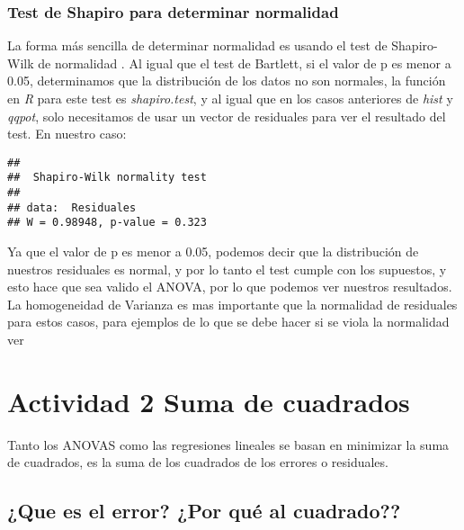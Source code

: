 \documentclass[]{book}
\newenvironment{Shaded}{\begin{snugshade}}{\end{snugshade}}
\newcommand{\KeywordTok}[1]{\textcolor[rgb]{0.13,0.29,0.53}{\textbf{#1}}}
\newcommand{\NormalTok}[1]{#1}
\newcommand{\OperatorTok}[1]{\textcolor[rgb]{0.81,0.36,0.00}{\textbf{#1}}}
\begin{document}
\hypertarget{test-de-shapiro-para-determinar-normalidad}{%
\subsubsection{Test de Shapiro para determinar normalidad}\label{test-de-shapiro-para-determinar-normalidad}}

La forma más sencilla de determinar normalidad es usando el test de Shapiro-Wilk de normalidad \citep{royston1995remark}. Al igual que el test de Bartlett, si el valor de p es menor a 0.05, determinamos que la distribución de los datos no son normales, la función en \emph{R} para este test es \emph{shapiro.test}, y al igual que en los casos anteriores de \emph{hist} y \emph{qqpot}, solo necesitamos de usar un vector de residuales para ver el resultado del test. En nuestro caso:

\begin{Shaded}
\end{Shaded}

\begin{verbatim}
## 
##  Shapiro-Wilk normality test
## 
## data:  Residuales
## W = 0.98948, p-value = 0.323
\end{verbatim}

Ya que el valor de p es menor a 0.05, podemos decir que la distribución de nuestros residuales es normal, y por lo tanto el test cumple con los supuestos, y esto hace que sea valido el ANOVA, por lo que podemos ver nuestros resultados. La homogeneidad de Varianza es mas importante que la normalidad de residuales para estos casos, para ejemplos de lo que se debe hacer si se viola la normalidad ver \citet{lix1996consequences}

\hypertarget{actividad-2-suma-de-cuadrados}{%
\section{Actividad 2 Suma de cuadrados}\label{actividad-2-suma-de-cuadrados}}

Tanto los ANOVAS como las regresiones lineales se basan en minimizar la suma de cuadrados, es la suma de los cuadrados de los errores o residuales.

\hypertarget{que-es-el-error-por-que-al-cuadrado}{%
\subsection{¿Que es el error? ¿Por qué al cuadrado??}\label{que-es-el-error-por-que-al-cuadrado}}
\end{document}
